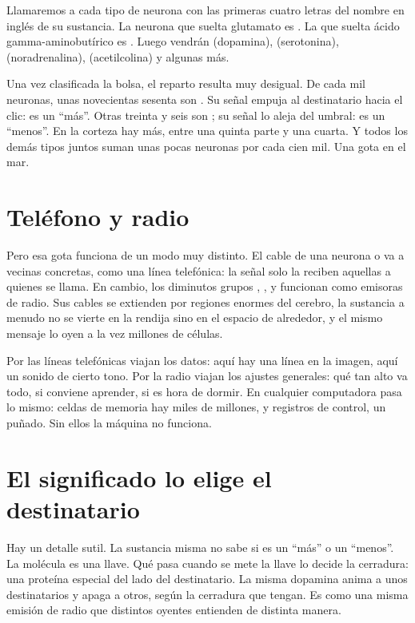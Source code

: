 Llamaremos a cada tipo de neurona con las primeras cuatro letras del nombre en inglés de su sustancia. La neurona que suelta glutamato es . La que suelta ácido gamma-aminobutírico es . Luego vendrán  (dopamina),  (serotonina),  (noradrenalina),  (acetilcolina) y algunas más.

Una vez clasificada la bolsa, el reparto resulta muy desigual. De cada mil neuronas, unas novecientas sesenta son . Su señal empuja al destinatario hacia el clic: es un “más”. Otras treinta y seis son ; su señal lo aleja del umbral: es un “menos”. En la corteza hay más, entre una quinta parte y una cuarta. Y todos los demás tipos juntos suman unas pocas neuronas por cada cien mil. Una gota en el mar.

\section*{Teléfono y radio}

Pero esa gota funciona de un modo muy distinto. El cable de una neurona  o  va a vecinas concretas, como una línea telefónica: la señal solo la reciben aquellas a quienes se llama. En cambio, los diminutos grupos , ,  y  funcionan como emisoras de radio. Sus cables se extienden por regiones enormes del cerebro, la sustancia a menudo no se vierte en la rendija sino en el espacio de alrededor, y el mismo mensaje lo oyen a la vez millones de células.

Por las líneas telefónicas viajan los datos: aquí hay una línea en la imagen, aquí un sonido de cierto tono. Por la radio viajan los ajustes generales: qué tan alto va todo, si conviene aprender, si es hora de dormir. En cualquier computadora pasa lo mismo: celdas de memoria hay miles de millones, y registros de control, un puñado. Sin ellos la máquina no funciona.

\section*{El significado lo elige el destinatario}

Hay un detalle sutil. La sustancia misma no sabe si es un “más” o un “menos”. La molécula es una llave. Qué pasa cuando se mete la llave lo decide la cerradura: una proteína especial del lado del destinatario. La misma dopamina anima a unos destinatarios y apaga a otros, según la cerradura que tengan. Es como una misma emisión de radio que distintos oyentes entienden de distinta manera.

